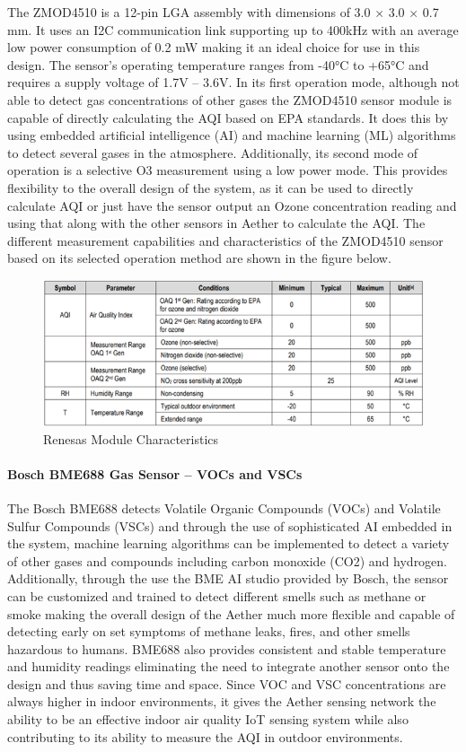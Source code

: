 The ZMOD4510 is a 12-pin LGA assembly with dimensions of 3.0 × 3.0 × 0.7 mm. It uses an I2C communication link supporting up to 400kHz with an average low power consumption of 0.2 mW making it an ideal choice for use in this design. The sensor’s operating temperature ranges from -40°C to +65°C and requires a supply voltage of 1.7V – 3.6V. In its first operation mode, although not able to detect gas concentrations of other gases the ZMOD4510 sensor module is capable of directly calculating the AQI based on EPA standards. It does this by using embedded artificial intelligence (AI) and machine learning (ML) algorithms to detect several gases in the atmosphere. Additionally, its second mode of operation is a selective O3 measurement using a low power mode. This provides flexibility to the overall design of the system, as it can be used to directly calculate AQI or just have the sensor output an Ozone concentration reading and using that along with the other sensors in Aether to calculate the AQI. The different measurement capabilities and characteristics of the ZMOD4510 sensor based on its selected operation method are shown in the figure below. 

\begin{figure}
\centering
\includegraphics[width=6in]{figures/Renesas Sensor Op.png}
\caption{Renesas Module Characteristics}
\label{ZMOD4510 Table}
\end{figure}

\paragraph{Bosch BME688 Gas Sensor – VOCs and VSCs}
The Bosch BME688 detects Volatile Organic Compounds (VOCs) and Volatile Sulfur Compounds (VSCs) and through the use of sophisticated AI embedded in the system, machine learning algorithms can be implemented to detect a variety of other gases and compounds including carbon monoxide (CO2) and hydrogen. Additionally, through the use the BME AI studio provided by Bosch, the sensor can be customized and trained to detect different smells such as methane or smoke making the overall design of the Aether much more flexible and capable of detecting early on set symptoms of methane leaks, fires, and other smells hazardous to humans. BME688 also provides consistent and stable temperature and humidity readings eliminating the need to integrate another sensor onto the design and thus saving time and space. Since VOC and VSC concentrations are always higher in indoor environments, it gives the Aether sensing network the ability to be an effective indoor air quality IoT sensing system while also contributing to its ability to measure the AQI in outdoor environments. 

